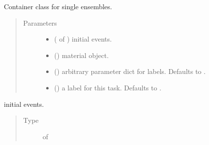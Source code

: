 \documentclass[letterpaper,10pt,english]{sphinxmanual}
\begin{document}
\begin{fulllineitems}
\label{\detokenize{interface:scdc.interface.EnsembleTask}}
Container class for single ensembles.
\begin{quote}\begin{description}
\item[{Parameters}] \leavevmode\begin{itemize}
\item {} 
 ( of ) \textendash{} initial events.

\item {} 
 () \textendash{} material object.

\item {} 
 (\sphinxstyleliteralemphasis{\sphinxupquote{, }}) \textendash{} arbitrary parameter dict for labels.
Defaults to \sphinxtitleref{\{\}}.

\item {} 
 (\sphinxstyleliteralemphasis{\sphinxupquote{, }}) \textendash{} a label for this task. Defaults to .

\end{itemize}

\end{description}\end{quote}

\begin{fulllineitems}
\label{\detokenize{interface:scdc.interface.EnsembleTask.initial}}
initial events.
\begin{quote}\begin{description}
\item[{Type}] \leavevmode
{} of 


\end{description}
\end{quote}
\end{fulllineitems}
\end{fulllineitems}
\end{document}
